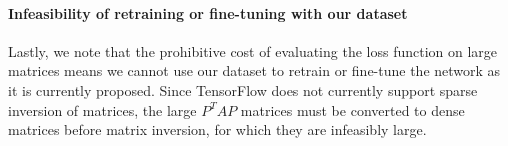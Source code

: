 \documentclass{svproc}
\begin{document}



\paragraph{Infeasibility of retraining or fine-tuning with our dataset}
Lastly, we note that the prohibitive cost of evaluating the loss function on large matrices means we cannot use our dataset to retrain or fine-tune the network as it is currently proposed. Since TensorFlow does not currently support sparse inversion of matrices, the large $P^TAP$ matrices must be converted to dense matrices before matrix inversion, for which they are infeasibly large.






\end{document}
